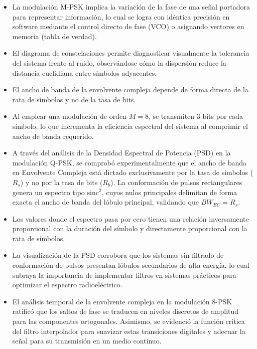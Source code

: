 
\begin{itemize}

    
    \item La modulación M-PSK implica la variación de la fase de una señal portadora para representar información, lo cual se logra con idéntica precisión en software mediante el control directo de fase (VCO) o asignando vectores en memoria (tabla de verdad).
    
    \item El diagrama de constelaciones permite diagnosticar visualmente la tolerancia del sistema frente al ruido, observándose cómo la dispersión reduce la distancia euclidiana entre símbolos adyacentes.
    
    \item El ancho de banda de la envolvente compleja depende de forma directa de la rata de símbolos y no de la tasa de bits.
    
    \item Al emplear una modulación de orden $M=8$, se transmiten 3 bits por cada símbolo, lo que incrementa la eficiencia espectral del sistema al comprimir el ancho de banda requerido.

    \item A través del análisis de la Densidad Espectral de Potencia (PSD) en la modulación Q-PSK, se comprobó experimentalmente que el ancho de banda en Envolvente Compleja está dictado exclusivamente por la tasa de símbolos ($R_s$) y no por la tasa de bits ($R_b$). La conformación de pulsos rectangulares genera un espectro tipo $\text{sinc}^2$, cuyos nulos principales delimitan de forma exacta el ancho de banda del lóbulo principal, validando que $BW_{EC} = R_s$.

    \item Los valores donde el espectro pasa por cero tienen una relación inversamente proporcional con la duración del símbolo y directamente proporcional con la rata de símbolos.

    \item La visualización de la PSD corrobora que los sistemas sin filtrado de conformación de pulsos presentan lóbulos secundarios de alta energía, lo cual subraya la importancia de implementar filtros en sistemas prácticos para optimizar el espectro radioeléctrico.

    \item El análisis temporal de la envolvente compleja en la modulación 8-PSK ratificó que los saltos de fase se traducen en niveles discretos de amplitud para las componentes ortogonales. Asimismo, se evidenció la función crítica del filtro interpolador para suavizar estas transiciones digitales y adecuar la señal para su transmisión en un medio continuo.


\end{itemize}
